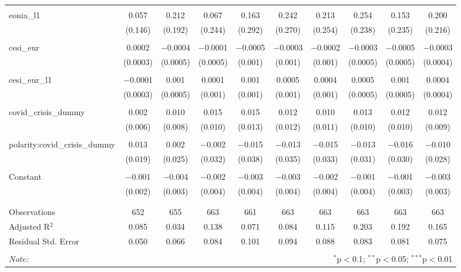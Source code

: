 \begin{table}[!htbp]
\begin{adjustbox}{width=1.25\textwidth}
\begin{tabular}{@{\extracolsep{5pt}}lccccccccc}
  & & & & & & & & & \\ 
 eonia\_l1 & 0.057 & 0.212 & 0.067 & 0.163 & 0.242 & 0.213 & 0.254 & 0.153 & 0.200 \\ 
  & (0.146) & (0.192) & (0.244) & (0.292) & (0.270) & (0.254) & (0.238) & (0.235) & (0.216) \\ 
  & & & & & & & & & \\ 
 cesi\_eur & 0.0002 & $-$0.0004 & $-$0.0001 & $-$0.0005 & $-$0.0003 & $-$0.0002 & $-$0.0003 & $-$0.0005 & $-$0.0003 \\ 
  & (0.0003) & (0.0005) & (0.0005) & (0.001) & (0.001) & (0.001) & (0.0005) & (0.0005) & (0.0004) \\ 
  & & & & & & & & & \\ 
 cesi\_eur\_l1 & $-$0.0001 & 0.001 & 0.0001 & 0.001 & 0.0005 & 0.0004 & 0.0005 & 0.001 & 0.0004 \\ 
  & (0.0003) & (0.0005) & (0.001) & (0.001) & (0.001) & (0.001) & (0.0005) & (0.0005) & (0.0004) \\ 
  & & & & & & & & & \\ 
 covid\_crisis\_dummy & 0.002 & 0.010 & 0.015 & 0.015 & 0.012 & 0.010 & 0.013 & 0.012 & 0.012 \\ 
  & (0.006) & (0.008) & (0.010) & (0.013) & (0.012) & (0.011) & (0.010) & (0.010) & (0.009) \\ 
  & & & & & & & & & \\ 
 polarity:covid\_crisis\_dummy & 0.013 & 0.002 & $-$0.002 & $-$0.015 & $-$0.013 & $-$0.015 & $-$0.013 & $-$0.016 & $-$0.010 \\ 
  & (0.019) & (0.025) & (0.032) & (0.038) & (0.035) & (0.033) & (0.031) & (0.030) & (0.028) \\ 
  & & & & & & & & & \\ 
 Constant & $-$0.001 & $-$0.004 & $-$0.002 & $-$0.003 & $-$0.003 & $-$0.002 & $-$0.001 & $-$0.001 & $-$0.003 \\ 
  & (0.002) & (0.003) & (0.004) & (0.004) & (0.004) & (0.004) & (0.004) & (0.003) & (0.003) \\ 
  & & & & & & & & & \\ 
\hline \\[-1.8ex] 
Observations & 652 & 655 & 663 & 661 & 663 & 663 & 663 & 663 & 663 \\ 
Adjusted R$^{2}$ & 0.085 & 0.034 & 0.138 & 0.071 & 0.084 & 0.115 & 0.203 & 0.192 & 0.165 \\ 
Residual Std. Error & 0.050 & 0.066 & 0.084 & 0.101 & 0.094 & 0.088 & 0.083 & 0.081 & 0.075 \\ 
\hline 
\hline \\[-1.8ex] 
\textit{Note:}  & \multicolumn{9}{r}{$^{*}$p$<$0.1; $^{**}$p$<$0.05; $^{***}$p$<$0.01} \\ 
\end{tabular} 
\end{adjustbox} 
\end{table} 
